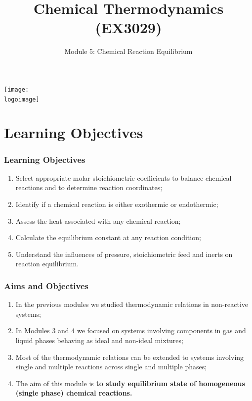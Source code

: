 \documentclass[10pt,compress,unknownkeysallowed]{beamer}
\institute{School of Engineering}
\title{Chemical Thermodynamics (EX3029)}
\subtitle{Module 5: Chemical Reaction Equilibrium}
\date[ ]{ }
\newcommand{\logoimage}{../../FigBanner/UoAHorizBanner}
\begin{document}
\begin{frame}
  \titlepage
  \vfill%
  \begin{center}
    \texttt{[image: \\logoimage]}
  \end{center}
\end{frame}




\section{Learning Objectives}

\begin{frame}
 \frametitle{Learning Objectives}
   \begin{enumerate}
     \item Select appropriate molar stoichiometric coefficients to balance chemical reactions and to determine reaction coordinates;
     \item Identify if a chemical reaction is either exothermic or endothermic;
     \item Assess the heat associated with any chemical reaction;
     \item Calculate the equilibrium constant at any reaction condition;
     \item Understand the influences of pressure, stoichiometric feed and inerts on reaction equilibrium.
   \end{enumerate}
\end{frame}

\begin{frame}
 \frametitle{Aims and Objectives}
   \begin{enumerate}
     \item<1-> In the previous modules we studied thermodynamic relations in non-reactive systems;
     \item<1-> In Modules 3 and 4 we focused on systems involving components in gas and liquid phases behaving as ideal and non-ideal mixtures;
     \item<2-> Most of the thermodynamic relations can be extended to systems involving single and multiple reactions across single and multiple phases;
     \item<2-> The aim of this module is {\bf to study equilibrium state of homogeneous (\ie single phase) chemical reactions.}
   \end{enumerate}
\end{frame}
\end{document}
